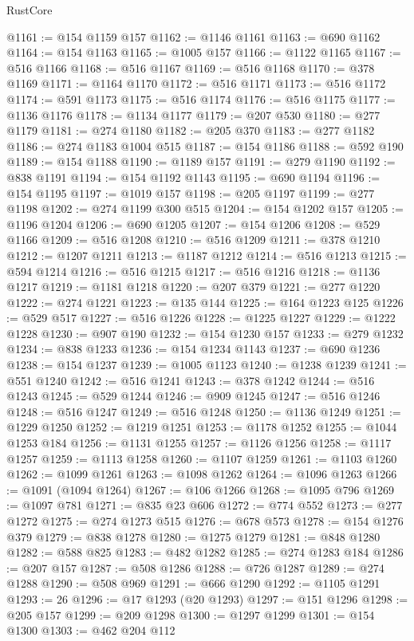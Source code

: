 \begin{lexlean}{RustCore}
\begin{coremodule}
@1161 := @154 @1159 @157
@1162 := @1146 @1161
@1163 := @690 @1162
@1164 := @154 @1163
@1165 := @1005 @157
@1166 := @1122 @1165
@1167 := @516 @1166
@1168 := @516 @1167
@1169 := @516 @1168
@1170 := @378 @1169
@1171 := @1164 @1170
@1172 := @516 @1171
@1173 := @516 @1172
@1174 := @591 @1173
@1175 := @516 @1174
@1176 := @516 @1175
@1177 := @1136 @1176
@1178 := @1134 @1177
@1179 := @207 @530
@1180 := @277 @1179
@1181 := @274 @1180
@1182 := @205 @370
@1183 := @277 @1182
@1186 := @274 @1183 @1004 @515
@1187 := @154 @1186
@1188 := @592 @190
@1189 := @154 @1188
@1190 := @1189 @157
@1191 := @279 @1190
@1192 := @838 @1191
@1194 := @154 @1192 @1143
@1195 := @690 @1194
@1196 := @154 @1195
@1197 := @1019 @157
@1198 := @205 @1197
@1199 := @277 @1198
@1202 := @274 @1199 @300 @515
@1204 := @154 @1202 @157
@1205 := @1196 @1204
@1206 := @690 @1205
@1207 := @154 @1206
@1208 := @529 @1166
@1209 := @516 @1208
@1210 := @516 @1209
@1211 := @378 @1210
@1212 := @1207 @1211
@1213 := @1187 @1212
@1214 := @516 @1213
@1215 := @594 @1214
@1216 := @516 @1215
@1217 := @516 @1216
@1218 := @1136 @1217
@1219 := @1181 @1218
@1220 := @207 @379
@1221 := @277 @1220
@1222 := @274 @1221
@1223 := @135 @144
@1225 := @164 @1223 @125
@1226 := @529 @517
@1227 := @516 @1226
@1228 := @1225 @1227
@1229 := @1222 @1228
@1230 := @907 @190
@1232 := @154 @1230 @157
@1233 := @279 @1232
@1234 := @838 @1233
@1236 := @154 @1234 @1143
@1237 := @690 @1236
@1238 := @154 @1237
@1239 := @1005 @1123
@1240 := @1238 @1239
@1241 := @551 @1240
@1242 := @516 @1241
@1243 := @378 @1242
@1244 := @516 @1243
@1245 := @529 @1244
@1246 := @909 @1245
@1247 := @516 @1246
@1248 := @516 @1247
@1249 := @516 @1248
@1250 := @1136 @1249
@1251 := @1229 @1250
@1252 := @1219 @1251
@1253 := @1178 @1252
@1255 := @1044 @1253 @184
@1256 := @1131 @1255
@1257 := @1126 @1256
@1258 := @1117 @1257
@1259 := @1113 @1258
@1260 := @1107 @1259
@1261 := @1103 @1260
@1262 := @1099 @1261
@1263 := @1098 @1262
@1264 := @1096 @1263
@1266 := @1091 (@1094 @1264)
@1267 := @106 @1266
@1268 := @1095 @796
@1269 := @1097 @781
@1271 := @835 @23 @606
@1272 := @774 @552
@1273 := @277 @1272
@1275 := @274 @1273 @515
@1276 := @678 @573
@1278 := @154 @1276 @379
@1279 := @838 @1278
@1280 := @1275 @1279
@1281 := @848 @1280
@1282 := @588 @825
@1283 := @482 @1282
@1285 := @274 @1283 @184
@1286 := @207 @157
@1287 := @508 @1286
@1288 := @726 @1287
@1289 := @274 @1288
@1290 := @508 @969
@1291 := @666 @1290
@1292 := @1105 @1291
@1293 := 26
@1296 := @17 @1293 (@20 @1293)
@1297 := @151 @1296
@1298 := @205 @157
@1299 := @209 @1298
@1300 := @1297 @1299
@1301 := @154 @1300
@1303 := @462 @204 @112

\end{coremodule}
\end{lexlean}
